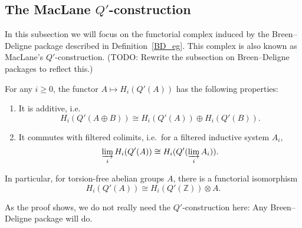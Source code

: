 \subsection{The MacLane $Q'$-construction}

In this subsection we will focus on the functorial complex induced by the Breen--Deligne package
described in Definition~\ref{BD_eg}.
This complex is also known as MacLane's $Q'$-construction.
(TODO: Rewrite the subsection on Breen--Deligne packages to reflect this.)

\begin{proposition}
  \label{homology-Qprime}
  \leanok
  For any $i\geq 0$, the functor $A\mapsto H_i(Q'(A))$ has the following properties:
  \begin{enumerate}
    \item It is additive, i.e.
      \[ H_i(Q'(A\oplus B))\cong H_i(Q'(A))\oplus H_i(Q'(B)).  \]
    \item It commutes with filtered colimits, i.e.~for a filtered inductive system $A_i$,
      \[ \varinjlim_i H_i(Q'(A))\cong H_i(Q'(\varinjlim_i A_i)). \]
  \end{enumerate}

  In particular, for torsion-free abelian groups $A$, there is a functorial isomorphism
  \[ H_i(Q'(A))\cong H_i(Q'(\mathbb Z))\otimes A.  \]
\end{proposition}

As the proof shows, we do not really need the $Q'$-construction here: Any Breen--Deligne package will do.

